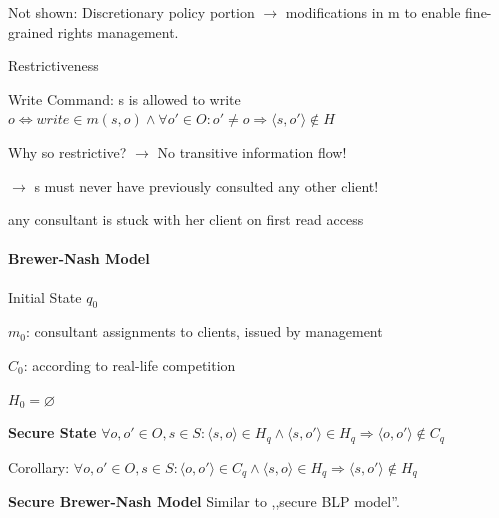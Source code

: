 \documentclass[a4paper]{article}
\renewcommand{\note}[2]{\begin{noteBox} \textbf{#1} #2 \end{noteBox}}
\begin{document}
\begin{multicols}{3}
    Not shown: Discretionary policy portion $\rightarrow$ modifications in m to enable fine-grained rights management.

    Restrictiveness
    \begin{itemize*}
        \item Write Command: s is allowed to write $o\Leftrightarrow write\in m(s,o)\wedge\forall o'\in O:o'\not=o\Rightarrow\langle s,o'\rangle \not\in H$
        \item Why so restrictive? $\rightarrow$ No transitive information flow!
        \item $\rightarrow$ s must never have previously consulted any other client!
        \item any consultant is stuck with her client on first read access
    \end{itemize*}

    \paragraph{Brewer-Nash Model}
    \begin{itemize*}
        \item Initial State $q_0$
        \begin{itemize*}
            \item $m_0$: consultant assignments to clients, issued by management
            \item $C_0$: according to real-life competition
            \item $H_0 =\varnothing$
        \end{itemize*}
    \end{itemize*}

    \note{Secure State}{$\forall o,o' \in O,s\in S:\langle s,o\rangle \in H_q\wedge\langle s,o'\rangle \in H_q\Rightarrow\langle o,o'\rangle \not\in C_q$

        Corollary: $\forall o,o'\in O,s\in S:\langle o,o'\rangle \in C_q\wedge\langle s,o\rangle \in H_q\Rightarrow \langle s,o'\rangle \not\in H_q$
    }

    \note{Secure Brewer-Nash Model}{Similar to ,,secure BLP model''.}


\end{multicols}
\end{document}
